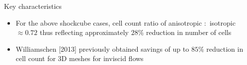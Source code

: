 \documentclass{beamer}
\begin{document}
\begin{frame}
\begin{minipage}[t][1\textheight]{1\textwidth}
\begin{exampleblock}{Key characteristics}
\begin{figure}
\end{figure}
\vspace{-15pt}
\begin{itemize}
\tiny
\item For the above shockcube cases, cell count ratio of anisotropic $:$ isotropic $\approx 0.72$ thus reflecting approximately $28 \%$ reduction in number of cells
\item Williamschen [2013] previously obtained savings of up to $85 \%$ reduction in cell count for 3D meshes for inviscid flows
\end{itemize}
\end{exampleblock}
\end{minipage}

\end{frame}



\end{document}
